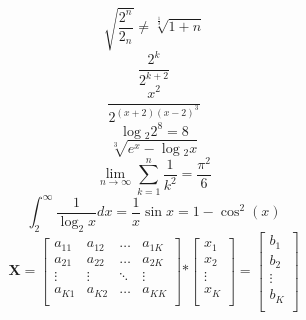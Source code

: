 \documentclass[a4paper]{article}
\begin{document}
$$ \sqrt{ \frac{2^{n}}{2_n}} \neq \sqrt[\frac{1}{3}]{1+n} $$
$$ \frac {2^{k}}{2^{k+2}} $$
$$ \frac {x^{2}}{2^{(x+2)(x-2)^3}} $$
$$ \log {_2{2^{8}}} = 8 $$
$$ \sqrt [3]{e^{x} - \log {{_2}x}} $$
$$ \lim_{n \to\infty} \sum_{k=1}^{n} \frac{1}{k^{2}} = \frac {\pi^2}{6}  $$
$$ \int_2^{\infty} \frac{1}{\log_2{x}}{dx} = \frac{1}{x}\sin\mathrm{}x=1-\cos^{2}(\mathrm{}x) $$
$$\mathbf{X} =
\left[ \begin{array}{cccc}
a_{11} & a_{12} & \ldots & a_{1K} \\
a_{21} & a_{22} & \ldots & a_{2K} \\
\vdots & \vdots & \ddots & \vdots \\
a_{K1} & a_{K2}  & \ldots & a_{KK} \\
\end{array} \right]
\mathbf{*}
\left[ \begin{array}{c}
x_{1}   \\
x_{2}  \\
\vdots  \\
x_{K} \\
\end{array} \right]
\mathbf{}=
\left[ \begin{array}{c}
b_{1}   \\
b_{2}  \\
\vdots  \\
b_{K} \\
\end{array} \right]
$$
\end{document}
